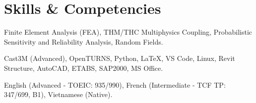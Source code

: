 \documentclass[11pt]{article} %
\begin{document}
\section{Skills \& Competencies}
\begin{description}[itemsep=0pt]
    \item[Technical:] Finite Element Analysis (FEA), THM/THC Multiphysics Coupling, Probabilistic Sensitivity and Reliability Analysis, Random Fields.
    \item[Software:] Cast3M (Advanced), OpenTURNS, Python, LaTeX, VS Code, Linux, Revit Structure, AutoCAD, ETABS, SAP2000, MS Office.
    \item[Languages:] English (Advanced - TOEIC: 935/990), French (Intermediate - TCF TP: 347/699, B1), Vietnamese (Native).
\end{description}

\vfill
{}
\end{document}
